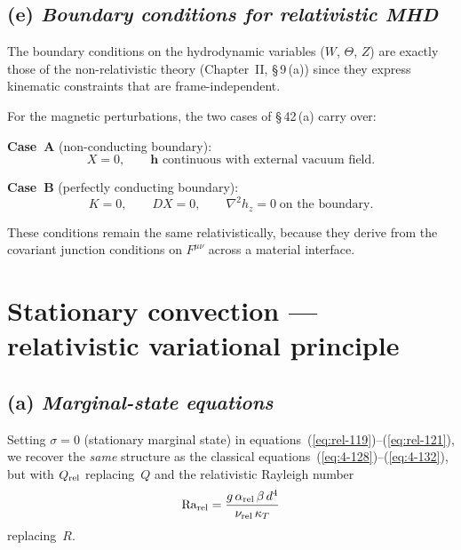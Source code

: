 \subsection*{(e) \emph{Boundary conditions for relativistic MHD}}

The boundary conditions on the hydrodynamic variables ($W$, $\Theta$,
$Z$) are exactly those of the non-relativistic theory (Chapter~II,
\S\,9\,(a)) since they express kinematic constraints that are
frame-independent.

For the magnetic perturbations, the two cases of \S\,42\,(a) carry
over:

\medskip
\noindent\textbf{Case~A} (non-conducting boundary):
\begin{equation}\label{eq:rel-107}
  X = 0,\qquad
  \mathbf{h}\text{ continuous with external vacuum field}.
\end{equation}

\noindent\textbf{Case~B} (perfectly conducting boundary):
\begin{equation}\label{eq:rel-110}
  K = 0,\qquad DX = 0,\qquad
  \nabla^{2}h_{z}=0\;\text{on the boundary}.
\end{equation}

These conditions remain the same relativistically, because they
derive from the covariant junction conditions on $F^{\mu\nu}$ across
a material interface.

\section{Stationary convection --- relativistic variational
  principle}
\label{sec:rel-43}

\subsection*{(a) \emph{Marginal-state equations}}

Setting $\sigma=0$ (stationary marginal state) in
equations~(\ref{eq:rel-119})--(\ref{eq:rel-121}),
we recover the \emph{same} structure as the
classical equations~(\ref{eq:4-128})--(\ref{eq:4-132}), but with
$Q_{\mathrm{rel}}$ replacing~$Q$ and the relativistic Rayleigh number
\begin{equation}\label{eq:rel-Rarel-def}
  \mathrm{Ra}_{\mathrm{rel}}
  = \frac{g\,\alpha_{\text{rel}}\,\beta\,d^{4}}
         {\nu_{\text{rel}}\,\kappa_{T}}
\end{equation}
replacing~$R$.

